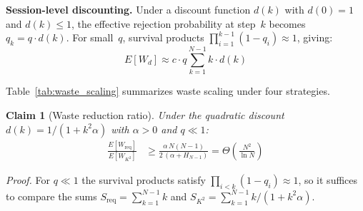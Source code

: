 \documentclass[sigconf,anonymous]{acmart}
\begin{document}
\textbf{Session-level discounting.}
Under a discount function $d(k)$ with $d(0){=}1$ and $d(k) \leq 1$, the effective rejection probability at step~$k$ becomes $q_k = q \cdot d(k)$. For small~$q$, survival products $\prod_{i=1}^{k-1}(1{-}q_i) \approx 1$, giving:
\begin{equation}
E[W_d] \approx c \cdot q \sum_{k=1}^{N-1} k \cdot d(k)
\label{eq:wd}
\end{equation}

Table~\ref{tab:waste_scaling} summarizes waste scaling under four strategies.

\begin{table}[h]
\centering\small
\caption{Expected waste scaling under different discount strategies ($q \ll 1$). $H_m = \sum_{k=1}^{m} 1/k$ is the harmonic number.}
\label{tab:waste_scaling}
\end{table}

\textbf{Claim 1} (Waste reduction ratio).
\textit{Under the quadratic discount $d(k) = 1/(1{+}k^2\alpha)$ with $\alpha > 0$ and $q \ll 1$:}
\begin{align}
\frac{E[W_{\text{req}}]}{E[W_{K^2}]} &\geq \frac{\alpha\, N(N{-}1)}{2\,(\alpha + H_{N-1})} = \Theta\!\left(\frac{N^2}{\ln N}\right)
\label{eq:ratio}
\end{align}

\textit{Proof.}
For $q \ll 1$ the survival products satisfy $\prod_{i<k}(1{-}q_i)\approx 1$, so it suffices to compare the sums $S_{\text{req}}=\sum_{k=1}^{N-1}k$ and $S_{K^2}=\sum_{k=1}^{N-1}k/(1{+}k^2\alpha)$.
\end{document}

